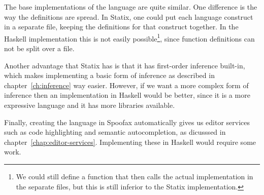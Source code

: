 The base implementations of the language are quite similar. One difference is the way the definitions are spread. In Statix, one could put each language construct in a separate file, keeping the definitions for that construct together. In the Haskell implementation this is not easily possible\footnote{We could still define a function that then calls the actual implementation in the separate files, but this is still inferior to the Statix implementation.}, since function definitions can not be split over a file. 

Another advantage that Statix has is that it has first-order inference built-in, which makes implementing a basic form of inference as described in chapter~\ref{ch:inference} way easier. However, if we want a more complex form of inference then an implementation in Haskell would be better, since it is a more expressive language and it has more libraries available. 

Finally, creating the language in Spoofax automatically gives us editor services such as code highlighting and semantic autocompletion, as dicusssed in chapter~\ref{chap:editor-services}. Implementing these in Haskell would require some work.
